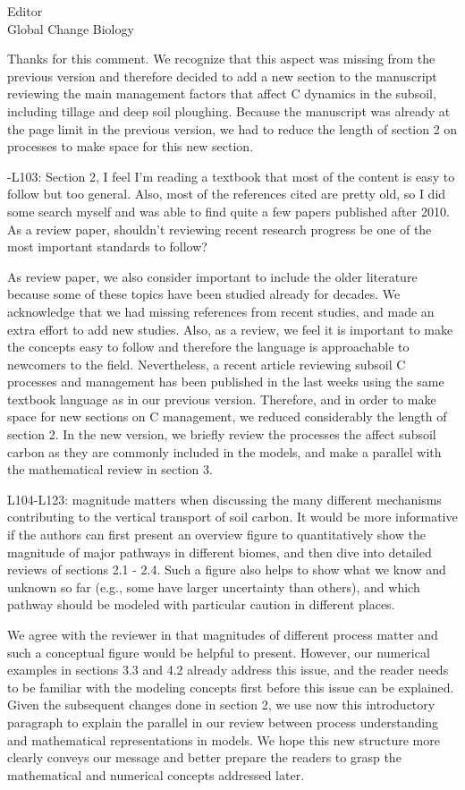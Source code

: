 \documentclass[11pt]{bgcletter}
\newcommand{\answer}[1] {
{\color{cyan} #1}
}
\begin{document}
\begin{letter}{Editor\\
   Global Change Biology
}
\answer{Thanks for this comment. We recognize that this aspect was missing from the previous version and therefore decided to add a new section to the manuscript reviewing the main management factors that affect C dynamics in the subsoil, including tillage and deep soil ploughing. Because the manuscript was already at the page limit in the previous version, we had to reduce the length of section 2 on processes to make space for this new section.}

-L103: Section 2, I feel I'm reading a textbook that most of the content is easy to follow but too general. Also, most of the references cited are pretty old, so I did some search myself and was able to find quite a few papers published after 2010. As a review paper, shouldn't reviewing recent research progress be one of the most important standards to follow?

\answer{As review paper, we also consider important to include the older literature because some of these topics have been studied already for decades. We acknowledge that we had missing references from recent studies, and made an extra effort to add new studies. Also, as a review, we feel it is important to make the concepts easy to follow and therefore the language is approachable to newcomers to the field. Nevertheless, a recent article reviewing subsoil C processes and management has been published in the last weeks using the same textbook language as in our previous version. Therefore, and in order to make space for new sections on C management, we reduced considerably the length of section 2. In the new version, we briefly review the processes the affect subsoil carbon as they are commonly included in the models, and make a parallel with the mathematical review in section 3.}

L104-L123: magnitude matters when discussing the many different mechanisms contributing to the vertical transport of soil carbon. It would be more informative if the authors can first present an overview figure to quantitatively show the magnitude of major pathways in different biomes, and then dive into detailed reviews of sections 2.1 - 2.4. Such a figure also helps to show what we know and unknown so far (e.g., some have larger uncertainty than others), and which pathway should be modeled with particular caution in different places.

\answer{We agree with the reviewer in that magnitudes of different process matter and such a conceptual figure would be helpful to present. However, our numerical examples in sections 3.3 and 4.2 already address this issue, and the reader needs to be familiar with the modeling concepts first before this issue can be explained. Given the subsequent changes done in section 2, we use now this introductory paragraph to explain the parallel in our review between process understanding and mathematical representations in models. We hope this new structure more clearly conveys our message and better prepare the readers to grasp the mathematical and numerical concepts addressed later.}


\end{letter}
\end{document}
